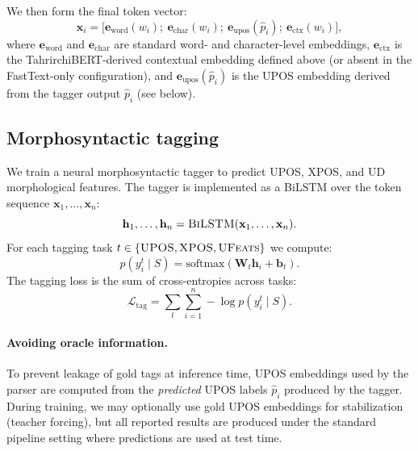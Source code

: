 \documentclass[runningheads]{llncs}
\begin{document}
We then form the final token vector:
\begin{equation}
\mathbf{x}_i =
\Big[
\mathbf{e}_{\text{word}}(w_i);\
\mathbf{e}_{\text{char}}(w_i);\
\mathbf{e}_{\text{upos}}(\hat{p}_i);\
\mathbf{e}_{\text{ctx}}(w_i)
\Big],
\end{equation}
where $\mathbf{e}_{\text{word}}$ and $\mathbf{e}_{\text{char}}$ are standard word- and character-level embeddings, $\mathbf{e}_{\text{ctx}}$ is the TahrirchiBERT-derived contextual embedding defined above (or absent in the FastText-only configuration), and $\mathbf{e}_{\text{upos}}(\hat{p}_i)$ is the UPOS embedding derived from the tagger output $\hat{p}_i$ (see below).

\subsection{Morphosyntactic tagging}
\label{subsec:tagging}
We train a neural morphosyntactic tagger to predict UPOS, XPOS, and UD morphological features. The tagger is implemented as a BiLSTM over the token sequence $\mathbf{x}_1,\dots,\mathbf{x}_n$:
\begin{equation}
\mathbf{h}_1,\dots,\mathbf{h}_n = \textsc{BiLSTM}(\mathbf{x}_1,\dots,\mathbf{x}_n).
\end{equation}
For each tagging task $t \in \{\textsc{UPOS}, \textsc{XPOS}, \textsc{UFeats}\}$ we compute:
\begin{equation}
p(y^t_i \mid S) = \text{softmax}(\mathbf{W}_t\mathbf{h}_i + \mathbf{b}_t).
\end{equation}
The tagging loss is the sum of cross-entropies across tasks:
\begin{equation}
\mathcal{L}_{\text{tag}} = \sum_{t}\sum_{i=1}^{n} -\log p(y^t_i \mid S).
\end{equation}

\paragraph{Avoiding oracle information.}
To prevent leakage of gold tags at inference time, UPOS embeddings used by the parser are computed from the \emph{predicted} UPOS labels $\hat{p}_i$ produced by the tagger. During training, we may optionally use gold UPOS embeddings for stabilization (teacher forcing), but all reported results are produced under the standard pipeline setting where predictions are used at test time.
\end{document}
